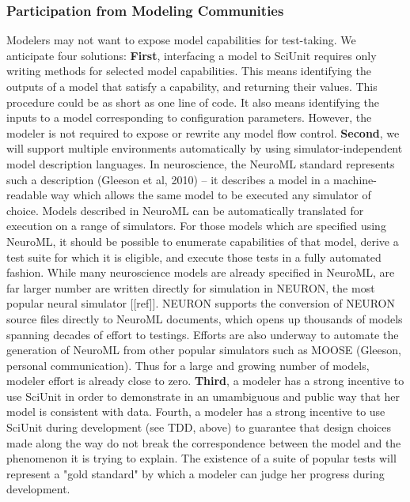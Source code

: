 \documentclass[11pt,letterpaper]{article}
\begin{document}
\subsubsection{Participation from Modeling Communities}
Modelers may not want to expose model capabilities for test-taking.  We anticipate four solutions: \textbf{First}, interfacing a model to SciUnit requires only writing methods for selected model capabilities.  This means identifying the outputs of a model that satisfy a capability, and returning their values.  This procedure could be as short as one line of code.  It also means identifying the inputs to a model corresponding to configuration parameters.  However, the modeler is not required to expose or rewrite any model flow control.  \textbf{Second}, we will support multiple environments automatically by using simulator-independent model description languages. In neuroscience, the NeuroML standard represents such a description (Gleeson et al, 2010) -- it describes a model in a machine-readable way which allows the same model to be executed any simulator of choice.  Models described in NeuroML can be automatically translated for execution on a range of simulators.  For those models which are specified using NeuroML, it should be possible to enumerate capabilities of that model, derive a test suite for which it is eligible, and execute those tests in a fully automated fashion.  While many neuroscience models are already specified in NeuroML, are far larger number are written directly for simulation in NEURON, the most popular neural simulator [[ref]].  NEURON supports the conversion of NEURON source files directly to NeuroML documents, which opens up thousands of models spanning decades of effort to testings.  Efforts are also underway to automate the generation of NeuroML from other popular simulators such as MOOSE (Gleeson, personal communication).  Thus for a large and growing number of models, modeler effort is already close to zero.  \textbf{Third}, a modeler has a strong incentive to use SciUnit in order to demonstrate in an umambiguous and public way that her model is consistent with data.  Fourth, a modeler has a strong incentive to use SciUnit during development (see TDD, above) to guarantee that design choices made along the way do not break the correspondence between the model and the phenomenon it is trying to explain.  The existence of a suite of popular tests will represent a "gold standard" by which a modeler can judge her progress during development.
\end{document}
